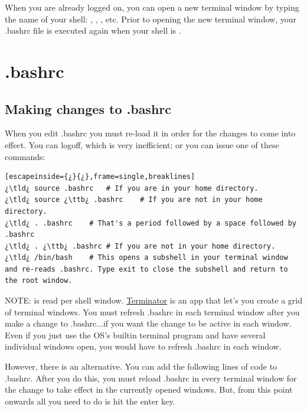 When you are already logged on, you can open a new terminal window by typing the name of your shell: , , , etc. Prior to opening the new terminal window, your \ttb{}.bashrc file is executed again when your shell is . 


\section{\ttb{}.bashrc}

\subsection{Making changes to \ttb{}.bashrc}
\label{subsec:makingchangesto-bashrc}

When you edit \ttb{}.bashrc you must re-load it in order for the changes to come into effect. You can logoff, which is very inefficient; or you can issue one of these commands:

\begin{lstlisting}[escapeinside={¿}{¿},frame=single,breaklines]
¿\tld¿ source .bashrc	# If you are in your home directory.
¿\tld¿ source ¿\ttb¿ .bashrc	# If you are not in your home directory.
¿\tld¿ . .bashrc	# That's a period followed by a space followed by .bashrc
¿\tld¿ . ¿\ttb¿ .bashrc	# If you are not in your home directory.
¿\tld¿ /bin/bash	# This opens a subshell in your terminal window and re-reads .bashrc. Type exit to close the subshell and return to the root window.
\end{lstlisting}

NOTE:  is read per shell window. \hyperref[subsec:terminator]{Terminator} is an app that let's you create a grid of terminal windows. You must refresh \ttb{}.bashrc in each terminal window after you make a change to \ttb{}.bashrc...if you want the change to be active in each window. Even if you just use the OS's builtin terminal program and have several individual windows open, you would have to refresh \ttb{}.bashrc in each window.

However, there is an alternative. You can add the following lines of code to \ttb{}.bashrc. After you do this, you must reload \ttb{}.bashrc in every terminal window for the change to take effect in the currently opened windows.  But, from this point onwards all you need to do is hit the enter key.

